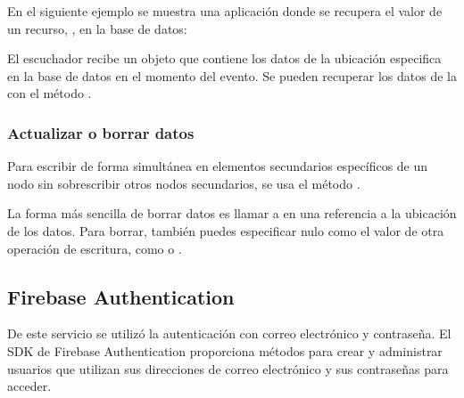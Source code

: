 En el siguiente ejemplo se muestra una aplicación donde se recupera el valor
de un recurso, , en la base de datos:

%
\begin{sphinxVerbatim}[commandchars=\\\{\}]
   
  
\end{sphinxVerbatim}

El escuchador recibe un objeto  que contiene los datos de la ubicación
especifica en la base de datos en el momento del evento. Se pueden recuperar
los datos de la  con el método .


\subsubsection*{Actualizar o borrar datos}
\label{\detokenize{firebase_web:actualizar-o-borrar-datos}}
Para escribir de forma simultánea en elementos secundarios específicos de un
nodo sin sobrescribir otros nodos secundarios, se usa el método .

La forma más sencilla de borrar datos es llamar a  en una referencia a
la ubicación de los datos. Para borrar, también puedes especificar nulo como
el valor de otra operación de escritura, como  o .


\subsection*{Firebase Authentication}

De este servicio se utilizó la autenticación con
correo electrónico y contraseña.
El SDK de Firebase Authentication proporciona métodos para crear y administrar usuarios que utilizan sus direcciones de correo electrónico y sus contraseñas para acceder.

